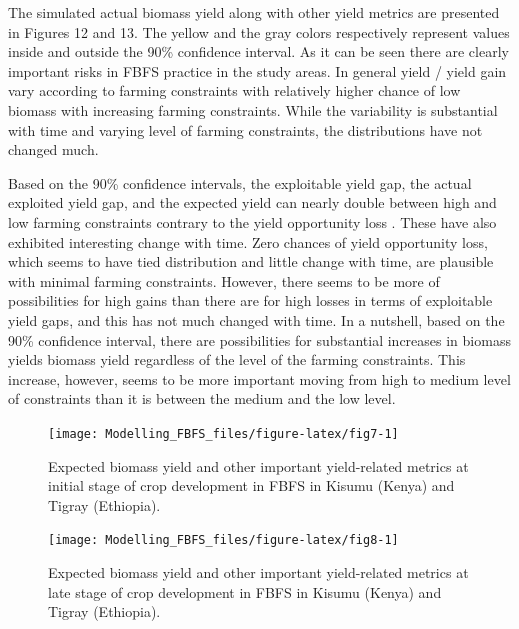 \documentclass[12pt,oneside]{article}
\begin{document}
The simulated actual biomass yield along with other yield metrics are presented in Figures 12 and 13. The yellow and the gray colors respectively represent values inside and outside the 90\% confidence interval. As it can be seen there are clearly important risks in FBFS practice in the study areas. In general yield / yield gain vary according to farming constraints with relatively higher chance of low biomass with increasing farming constraints. While the variability is substantial with time and varying level of farming constraints, the distributions have not changed much.

Based on the 90\% confidence intervals, the exploitable yield gap, the actual exploited yield gap, and the expected yield can nearly double between high and low farming constraints contrary to the yield opportunity loss . These have also exhibited interesting change with time. Zero chances of yield opportunity loss, which seems to have tied distribution and little change with time, are plausible with minimal farming constraints. However, there seems to be more of possibilities for high gains than there are for high losses in terms of exploitable yield gaps, and this has not much changed with time. In a nutshell, based on the 90\% confidence interval, there are possibilities for substantial increases in biomass yields biomass yield regardless of the level of the farming constraints. This increase, however, seems to be more important moving from high to medium level of constraints than it is between the medium and the low level.

\begin{figure}[!htbp]

{\centering \texttt{[image: Modelling\_FBFS\_files/figure-latex/fig7-1]} 

}

\caption{Expected biomass yield and other important yield-related metrics at initial stage of crop development in FBFS in Kisumu (Kenya) and Tigray (Ethiopia).}\label{fig:fig7}
\end{figure}

\begin{figure}[!htbp]

{\centering \texttt{[image: Modelling\_FBFS\_files/figure-latex/fig8-1]} 

}

\caption{Expected biomass yield and other important yield-related metrics at late stage of crop development in FBFS in Kisumu (Kenya) and Tigray (Ethiopia).}\label{fig:fig8}
\end{figure}
\end{document}
